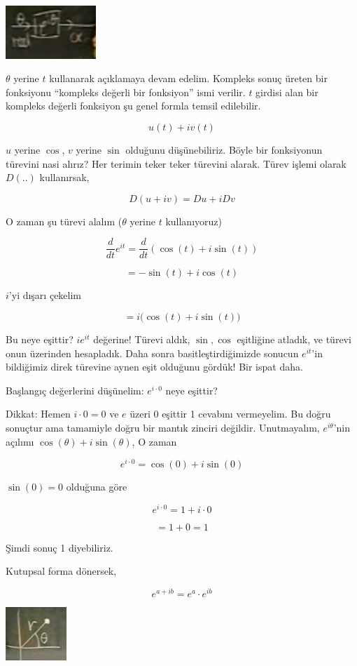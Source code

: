 \documentclass[12pt,fleqn]{article}\usepackage{../../common}
\begin{document}
\includegraphics[height=2cm]{6_3.png}

$\theta$ yerine $t$ kullanarak açıklamaya devam edelim. Kompleks sonuç
üreten bir fonksiyonu ``kompleks değerli bir fonksiyon'' ismi verilir. $t$
girdisi alan bir kompleks değerli fonksiyon şu genel formla temsil
edilebilir. 

$$ u(t) + iv(t) $$

$u$ yerine $\cos$, $v$ yerine $\sin$ olduğunu düşünebiliriz. Böyle bir
fonksiyonun türevini nasi alırız? Her terimin teker teker türevini
alarak. Türev işlemi olarak $D(..)$ kullanırsak,

$$ D(u+iv) = Du + iDv $$

O zaman şu türevi alalım ($\theta$ yerine $t$ kullanıyoruz) 

$$ \frac{d}{dt}e^{it} = \frac{d}{dt}(\cos(t) + i\sin(t)) $$

$$ = -\sin(t) + i\cos(t) $$

$i$'yi dışarı çekelim

$$ = i \bigg( \cos(t) + i\sin(t) \bigg) $$

Bu neye eşittir? $ie^{it}$ değerine! Türevi aldık, $\sin, \cos$ eşitliğine
atladık, ve türevi onun üzerinden hesapladık. Daha sonra
basitleştirdiğimizde sonucun $e^{it}$'in bildiğimiz direk türevine aynen
eşit olduğunu gördük! Bir ispat daha. 

Başlangıç değerlerini düşünelim: $e^{i\cdot 0}$ neye eşittir? 

Dikkat: Hemen $i \cdot 0 = 0$ ve $e$ üzeri $0$ eşittir 1 cevabını
vermeyelim. Bu doğru sonuçtur ama tamamiyle doğru bir mantık zinciri
değildir. Unutmayalım, $e^{i\theta}$'nin açılımı $\cos(\theta) +
i\sin(\theta)$, O zaman

$$ e^{i \cdot 0} = \cos(0) + i\sin(0) $$

$\sin(0) = 0$ olduğuna göre

$$ e^{i \cdot 0} = 1 + i \cdot 0 $$

$$ = 1 +  0  = 1$$

Şimdi sonuç 1 diyebiliriz.

Kutupsal forma dönersek, 

$$ e^{a+ib}  = e^a \cdot e^{ib}$$

\includegraphics[height=2cm]{6_4.png}
\end{document}
